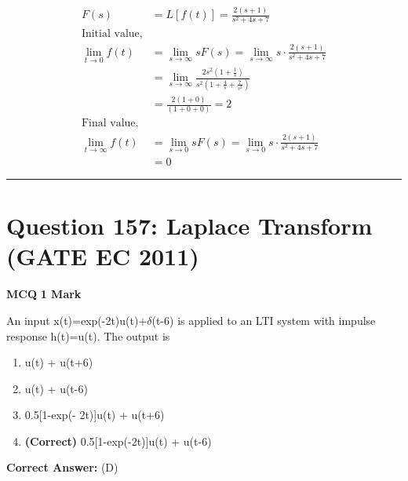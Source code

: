 \documentclass[11pt,a4paper]{article}
\begin{document}
\begin{tcolorbox}[solbox, title=Detailed Solution -- Question 156]
\[
\begin{aligned} F(s)&=L[f(t)]=\frac{2(s+1)}{s^{2}+4 s+7}\\ \text{Initial value,}\\ \lim _{t \rightarrow 0} f(t) &=\lim _{s \rightarrow \infty} s F(s)=\lim _{s \rightarrow \infty} s \cdot \frac{2(s+1)}{s^{2}+4 s+7} \\ &=\lim _{s \rightarrow \infty} \frac{2 s^{2}\left(1+\frac{1}{s}\right)}{s^{2}\left(1+\frac{4}{s}+\frac{7}{s^{2}}\right)} \\ &=\frac{2(1+0)}{(1+0+0)}=2\\ \text{Final value,}\\ \lim _{t \rightarrow \infty} f(t) &=\lim _{s \rightarrow 0} s F(s)=\lim _{s \rightarrow 0} s \cdot \frac{2(s+1)}{s^{2}+4 s+7} \\ &=0 \end{aligned}
\]
\end{tcolorbox}

\vspace{1.5em}
\hrule
\vspace{1.5em}

\section*{Question 157: Laplace Transform (GATE EC 2011)}
\noindent \textbf{\color{primary}MCQ} \hfill \textbf{\color{secondary}1 Mark}


\noindent An input x(t)=exp(-2t)u(t)+$\delta$(t-6) is applied to an LTI system with
impulse response h(t)=u(t). The output is


\begin{enumerate}[label=(\Alph*)]
    \item [1-exp(-2t)]u(t) + u(t+6)
    \item [1-exp(-2t)]u(t) + u(t-6)
    \item 0.5[1-exp(- 2t)]u(t) + u(t+6)
    \item \textbf{(Correct)} 0.5[1-exp(-2t)]u(t) + u(t-6)
\end{enumerate}

\noindent \textbf{Correct Answer:} (D)
\end{document}
